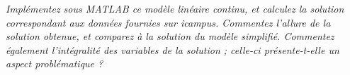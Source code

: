 \question %
\emph{Implémentez sous MATLAB ce modèle linéaire continu, 
et calculez la solution correspondant aux données fournies sur icampus. 
Commentez l'allure de la solution obtenue, et comparez à la solution du modèle
simplifié. Commentez également l'intégralité des variables de la solution ;
celle-ci présente-t-elle un aspect problématique ?}
